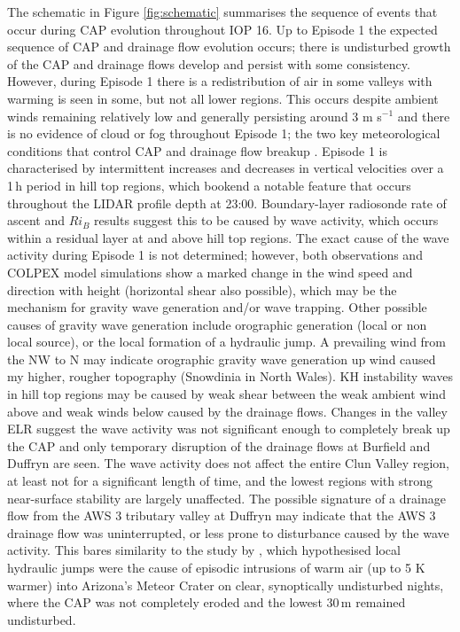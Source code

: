\documentclass[times]{qjrms4}
\begin{document}
The schematic in Figure \ref{fig:schematic} summarises the sequence of events that occur during CAP evolution throughout IOP 16. Up to Episode 1 the expected sequence of CAP and drainage flow evolution occurs; there is undisturbed growth of the CAP and drainage flows develop and persist with some consistency. However, during Episode 1 there is a redistribution of air in some valleys with warming is seen in some, but not all lower regions. This occurs despite ambient winds remaining relatively low and generally persisting around 3 m s$^{-1}$ and there is no evidence of cloud or fog throughout Episode 1; the two key meteorological conditions that control CAP and drainage flow breakup \citep{sheridan2013characteristics}. Episode 1 is characterised by intermittent increases and decreases in vertical velocities over a 1$\,\mbox{h}$ period in hill top regions, which bookend a notable feature that occurs throughout the LIDAR profile depth at 23:00. Boundary-layer radiosonde rate of ascent and $Ri_B$ results suggest this to be caused by wave activity, which occurs within a residual layer at and above hill top regions. The exact cause of the wave activity during Episode 1 is not determined; however, both observations and COLPEX model simulations \citep{Vosper2013narrow} show a marked change in the wind speed and direction with height (horizontal shear also possible), which may be the mechanism for gravity wave generation and/or wave trapping. Other possible causes of gravity wave generation include orographic generation (local or non local source), or the local formation of a hydraulic jump. A prevailing wind from the NW to N may indicate orographic gravity wave generation up wind caused my higher, rougher topography (Snowdinia in North Wales). KH instability waves in hill top regions may be caused by weak shear between the weak ambient wind above and weak winds below caused by the drainage flows. Changes in the valley ELR suggest the wave activity was not significant enough to completely break up the CAP and only temporary disruption of the drainage flows at Burfield and Duffryn are seen. The wave activity does not affect the entire Clun Valley region, at least not for a significant length of time, and the lowest regions with strong near-surface stability are largely unaffected. The possible signature of a drainage flow from the AWS 3 tributary valley at Duffryn may indicate that the AWS 3 drainage flow was uninterrupted, or less prone to disturbance caused by the wave activity. This bares similarity to the study by \citet{adler2012warm}, which hypothesised local hydraulic jumps were the cause of episodic intrusions of warm air (up to 5 K warmer) into Arizona’s Meteor Crater on clear, synoptically undisturbed nights, where the CAP was not completely eroded and the lowest 30$\,\mbox{m}$ remained undisturbed.
\end{document}
